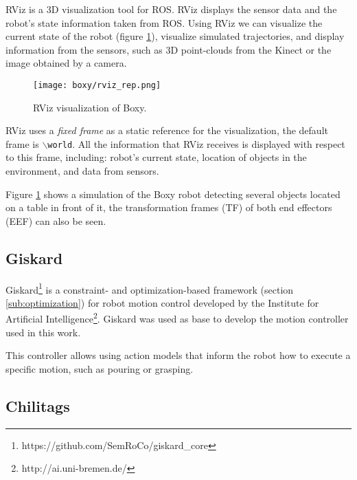 RViz is a 3D visualization tool for ROS. RViz displays the sensor data and the robot's state information taken from ROS. Using RViz we can visualize the current state of the robot (figure \ref{fig:rviz}), visualize simulated trajectories, and display information from the sensors, such as 3D point-clouds from the Kinect or the image obtained by a camera.

\begin{figure}[H]
	\centering
	\texttt{[image: boxy/rviz\_rep.png]}
	\vspace{-10pt}
	\caption{RViz visualization of Boxy.}
	\vspace{-15pt}
	\label{fig:rviz}
\end{figure}

RViz uses a \textit{fixed frame} as a static reference for the visualization, the default frame is  \texttt{$\backslash$world}. All the information that RViz receives is displayed with respect to this frame, including: robot's current state, location of objects in the environment, and data from sensors.

Figure \ref{fig:rviz} shows a simulation of the Boxy robot detecting several objects located on a table in front of it, the transformation frames (TF) of both end effectors (EEF) can also be seen.

\subsection{Giskard}
\label{subsec:giskard}
Giskard\footnote{https://github.com/SemRoCo/giskard\_core} is a constraint- and optimization-based framework (section \ref{sub:optimization}) for robot motion control developed by the Institute for Artificial Intelligence\footnote{http://ai.uni-bremen.de/}. Giskard was used as base to develop the motion controller used in this work.

This controller allows using action models that inform the robot how to execute a specific motion, such as pouring or grasping.

\subsection{Chilitags}
\label{subsec:chili}

